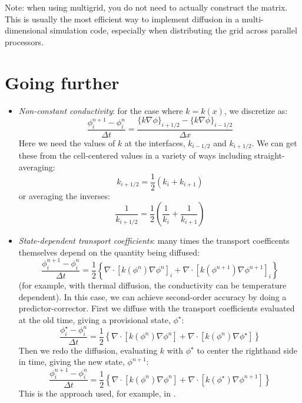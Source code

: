 Note: when using multigrid, you do not need to actually construct
the matrix.  This is usually the most efficient way to implement 
diffusion in a multi-dimensional simulation code, especially when
distributing the grid across parallel processors.

\section{Going further}

\begin{itemize}

\item {\em Non-constant conductivity}: for the case where $k = k(x)$,
  we discretize as:
  \begin{equation}
  \frac{\phi_i^{n+1} - \phi_i^n}{\Delta t} = 
        \frac{ \{ k \nabla \phi \}_{i+1/2} -
               \{ k \nabla \phi \}_{i-1/2}}{\Delta x}
  \end{equation}
 Here we need the values of $k$ at the interfaces, $k_{i-1/2}$ and
 $k_{i+1/2}$.  We can get these from the cell-centered values in a
 variety of ways including straight-averaging:
 \begin{equation}
 k_{i+1/2} = \frac{1}{2} (k_i + k_{i+1})
 \end{equation}
 or averaging the inverses:
 \begin{equation}
 \frac{1}{k_{i+1/2}} = \frac{1}{2} \left (\frac{1}{k_i} + \frac{1}{k_{i+1}} \right )
 \end{equation}
 
\item {\em State-dependent transport coefficients}: many times the
  transport coefficents themselves depend on the quantity being
  diffused:
  \begin{equation}
  \frac{\phi_i^{n+1} - \phi_i^n}{\Delta t} = 
        \frac{1}{2} \left \{
               \nabla \cdot [ k(\phi^n) \nabla \phi^n ]_i +
               \nabla \cdot [ k(\phi^{n+1}) \nabla \phi^{n+1} ]_i 
               \right \}
  \end{equation}
  (for example, with thermal diffusion, the conductivity can
  be temperature dependent).  In this case, we can achieve second-order
  accuracy by doing a predictor-corrector.  First we diffuse with
  the transport coefficients evaluated at the old time, giving a provisional
  state, $\phi^\star$:
  \begin{equation}
  \frac{\phi_i^\star - \phi_i^n}{\Delta t} = 
        \frac{1}{2} \left \{
               \nabla \cdot [ k(\phi^n) \nabla \phi^n ] +
               \nabla \cdot [ k(\phi^n) \nabla \phi^\star ] 
               \right \}
  \end{equation}
  Then we redo the diffusion, evaluating $k$ with $\phi^\star$ to
  center the righthand side in time, giving the new state, $\phi^{n+1}$:
  \begin{equation}
  \frac{\phi_i^{n+1} - \phi_i^n}{\Delta t} = 
        \frac{1}{2} \left \{
               \nabla \cdot [ k(\phi^n) \nabla \phi^n ] +
               \nabla \cdot [ k(\phi^\star) \nabla \phi^{n+1} ] 
               \right \}
  \end{equation}
  This is the approach used, for example, in \cite{SNpaper}.



\end{itemize}
